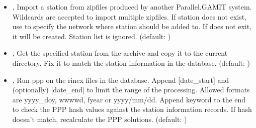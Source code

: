 \documentclass[letterpaper,10pt,english]{sphinxmanual}
\begin{document}
\begin{itemize}
\item {} 
\sphinxAtStartPar
{\hyperref[\detokenize{com:ScanArchive.py--import}]{}} , {\hyperref[\detokenize{com:ScanArchive.py---import_station}]{}}  \sphinxhyphen{} Import a station from zipfiles produced by another Parallel.GAMIT system. Wildcards are accepted to import multiple zipfiles. If station does not exist, use  to specify the network where station should be added to. If  does not exit, it will be created. Station list is ignored. (default: )

\item {} 
\sphinxAtStartPar
{\hyperref[\detokenize{com:ScanArchive.py--get}]{}} , {\hyperref[\detokenize{com:ScanArchive.py---get_from_archive}]{}}  \sphinxhyphen{} Get the specified station from the archive and copy it to the current directory. Fix it to match the station information in the database. (default: )

\item {} 
\sphinxAtStartPar
{\hyperref[\detokenize{com:ScanArchive.py--ppp}]{}} , {\hyperref[\detokenize{com:ScanArchive.py---ppp}]{}}  \sphinxhyphen{} Run ppp on the rinex files in the database. Append {[}date\_start{]} and (optionally) {[}date\_end{]} to limit the range of the processing. Allowed formats are yyyy\_doy, wwww\sphinxhyphen{}d, fyear or yyyy/mm/dd. Append keyword  to the end to check the PPP hash values against the station information records. If hash doesn’t match, recalculate the PPP solutions. (default: )


\end{itemize}
\end{document}
